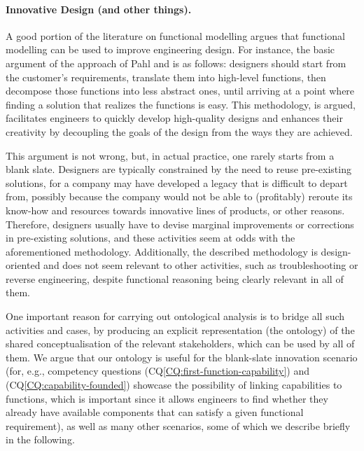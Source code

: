 \documentclass[sw]{iosart2x}
\newcommand{\CQLabel}{\textrm{CQ}}
\newcommand{\refCQ}[1]{({\CQLabel}\ref{#1})}
\begin{document}
\paragraph{Innovative Design (and other things).}
A good portion of the literature on functional modelling argues that functional modelling can be used to improve engineering design.
For instance, the basic argument of the approach of Pahl and \cite{pahl_engineering_2007} is as follows: designers should start from the customer's requirements, translate them into high-level functions, then decompose those functions into less abstract ones, until arriving at a point where finding a solution that realizes the functions is easy.
This methodology, is argued, facilitates engineers to quickly develop high-quality designs and enhances their creativity by decoupling the goals of the design from the ways they are achieved.

This argument is not wrong, but, in actual practice, one rarely starts from a blank slate. 
Designers are typically constrained by the need to reuse pre-existing solutions, for a company may have developed a legacy that is difficult to depart from, possibly because the company would not be able to (profitably) reroute its know-how and resources towards innovative lines of products, or other reasons.
Therefore, designers usually have to devise marginal improvements or corrections in pre-existing solutions, and these activities seem at odds with the aforementioned methodology. 
Additionally, the described methodology is design-oriented and does not seem relevant to other activities, such as troubleshooting or reverse engineering, despite functional reasoning being clearly relevant in all of them.

One important reason for carrying out ontological analysis is to bridge all such activities and cases, by producing an explicit representation (the ontology) of the shared conceptualisation of the relevant stakeholders, which can be used by all of them.
We argue that our ontology is useful for the blank-slate innovation scenario (for, e.g., competency questions \refCQ{CQ:first-function-capability} and \refCQ{CQ:capability-founded} showcase the possibility of linking capabilities to functions, which is important since it allows engineers to find whether they already have available components that can satisfy a given functional requirement), as well as many other scenarios, some of which we describe briefly in the following. 
\end{document}
